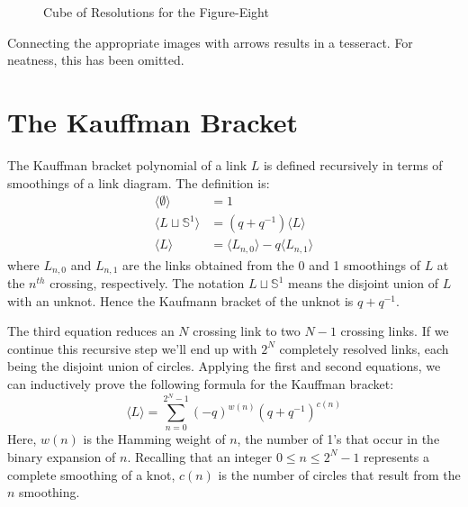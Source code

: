 \documentclass{article}
\theoremstyle{plain}
\begin{document}
        \begin{figure}
            \centering
            \caption{Cube of Resolutions for the Figure-Eight}
            \label{fig:figure_eight_knot_cube_of_resolutions}
        \end{figure}
        Connecting the appropriate images with arrows results in a tesseract.
        For neatness, this has been omitted.
    \section{The Kauffman Bracket}
        The Kauffman bracket polynomial of a link $L$ is defined recursively
        in terms of smoothings of a link diagram. The definition is:
        \begin{align}
            \langle\emptyset\rangle&=1\\
            \langle{L\sqcup\mathbb{S}^{1}}\rangle&=(q+q^{-1})\langle{L}\rangle\\
            \langle{L}\rangle&=
                \langle{L_{n,0}}\rangle-q\langle{L_{n,1}}\rangle
        \end{align}
        where $L_{n,0}$ and $L_{n,1}$ are the links obtained from the
        0 and 1 smoothings of $L$ at the $n^{th}$ crossing, respectively. The
        notation $L\sqcup\mathbb{S}^{1}$ means the disjoint union of
        $L$ with an unknot. Hence the Kaufmann bracket of the
        unknot is $q+q^{-1}$.
        \par\hfill\par
        The third equation reduces an $N$ crossing link to two $N-1$ crossing
        links. If we continue this recursive step we'll end up with
        $2^{N}$ completely resolved links, each being the disjoint union of
        circles. Applying the first and second equations, we can inductively
        prove the following formula for the Kauffman bracket:
        \begin{equation}
            \label{eqn:kauffman_bracket}%
            \langle{L}\rangle=\sum_{n=0}^{2^{N}-1}
                (-q)^{w(n)}(q+q^{-1})^{c(n)}
        \end{equation}
        Here, $w(n)$ is the Hamming weight of $n$, the number of 1's
        that occur in the binary expansion of $n$. Recalling that an integer
        $0\leq{n}\leq{2}^{N}-1$ represents a complete smoothing of a knot,
        $c(n)$ is the number of circles that result from the $n$ smoothing.
\end{document}
